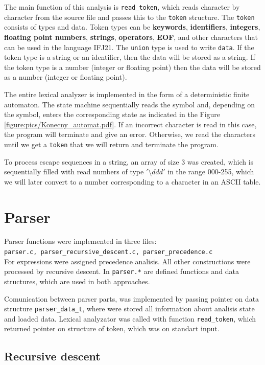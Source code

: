 \documentclass[11pt]{article}
\begin{document}
The main function of this analysis is \texttt {read\_token}, which reads character by character from the source file and passes this to the \texttt{token} structure. The \texttt{token} consists of types and data. Token types can be \textbf{keywords}, \textbf{identifiers}, \textbf{integers}, \textbf{floating point numbers}, \textbf{strings}, \textbf{operators}, \textbf{EOF}, and other characters that can be used in the language IFJ21. The \texttt{union} type is used to write \texttt{data}. If the token type is a string or an identifier, then the data will be stored as a string. If the token type is a number (integer or floating point) then the data will be stored as a number (integer or floating point). 

The entire lexical analyzer is implemented in the form of a deterministic finite automaton. The state machine sequentially reads the symbol and, depending on the symbol, enters the corresponding state as indicated in the Figure \ref{figure:pics/Konecny_automat.pdf}. If an incorrect character is read in this case, the program will terminate and give an error. Otherwise, we read the characters until we get a \texttt{token} that we will return and terminate the program.

To process escape sequences in a string, an array of size 3 was created, which is sequentially filled with read numbers of type $'\setminus{ddd}'$ in the range 000-255, which we will later convert to a number corresponding to a character in an ASCII table.

\section{Parser}
Parser functions were implemented in three files:\\ \texttt{parser.c, parser\_recursive\_descent.c, parser\_precedence.c} \\
For expressions were assigned precedence analisis. All other constructions were processed by recursive descent.
In \texttt{parser.*} are defined functions and data structures, which are used in both approaches.

Comunication between parser parts, was implemented by passing pointer on data structure \texttt{parser\_data\_t}, 
where were stored all information about analisis state and loaded data. Lexical analyzator was called with function \texttt{read\_token},
which returned pointer on structure of token, which was on standart input.

\subsection{Recursive descent}
\end{document}
